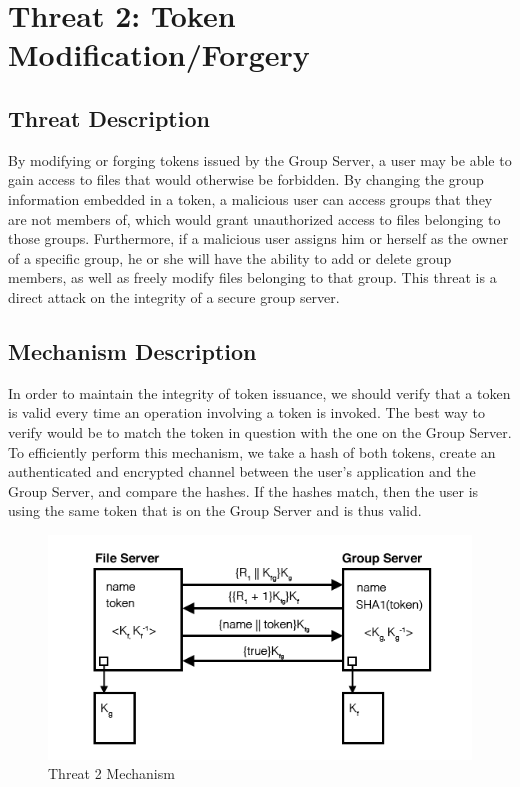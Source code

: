 \documentclass[11pt]{article}
\begin{document}
\section{Threat 2: Token Modification/Forgery}
\subsection{Threat Description}
By modifying or forging tokens issued by the Group Server, a user may be able to gain access to files that would otherwise be forbidden. By changing the group information embedded in a token, a malicious user can access groups that they are not members of, which would grant unauthorized access to files belonging to those groups. Furthermore, if a malicious user assigns him or herself as the owner of a specific group, he or she will have the ability to add or delete group members, as well as freely modify files belonging to that group. This threat is a direct attack on the integrity of a secure group server.
\subsection{Mechanism Description}
In order to maintain the integrity of token issuance, we should verify that a token is valid every time an operation involving a token is invoked. The best way to verify would be to match the token in question with the one on the Group Server. To efficiently perform this mechanism, we take a hash of both tokens, create an authenticated and encrypted channel between the user's application and the Group Server, and compare the hashes. If the hashes match, then the user is using the same token that is on the Group Server and is thus valid.
\begin{figure}[htbp]
\begin{center}
\includegraphics{threat2}
\caption{Threat 2 Mechanism}
\label{threat2}
\end{center}
\end{figure}
\end{document}
